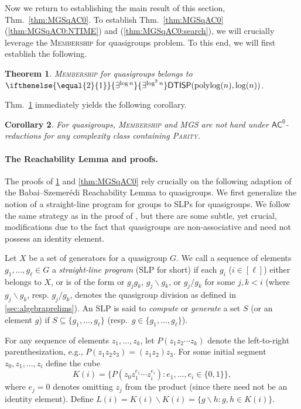 \documentclass{article}
\newtheorem{theorem}{Theorem}\newtheorem{lemma}[theorem]{Lemma}\newtheorem{proposition}[theorem]{Proposition}\newtheorem{corollary}[theorem]{Corollary}\newtheorem{definition}[theorem]{Definition}\newtheorem{claim}[theorem]{Claim}\newtheorem{remark}[theorem]{Remark}\newtheorem{observation}[theorem]{Observation}\newtheorem{conjecture}[theorem]{Conjecture}\newtheorem{example}[theorem]{Example}
\newcommand{\algprobm}[1]{\textsc{#1}\xspace}
\newcommand{\betacc}[1]{\ifthenelse{\equal{#1}{1}}{\exists^{\log n}}{\exists^{\log^{#1}n}}} %
\newcommand{\Thm}[1]{Thm.~\ref{#1}\xspace}
\newcommand*{\ComplexityClass}[1]{\ensuremath{\mathsf{#1}}\xspace}
\newcommand{\DTISP}{\ComplexityClass{DTISP}}
\newcommand{\DTISPpll}{\ensuremath{\DTISP(\mathrm{polylog}(n),\mathrm{log}(n))}\xspace}
\newcommand{\ACz}{\ComplexityClass{AC^0}}
\begin{document}
Now we return to establishing the main result of this section, \Thm{thm:MGSqAC0}. To establish \Thm{thm:MGSqAC0}(\ref{thm:MGSqAC0:NTIME}) and (\ref{thm:MGSqAC0:search}), we will crucially leverage the \algprobm{Membership} for quasigroups problem. To this end, we will first establish the following.
\begin{theorem}\label{thm:CQMqAC0}
\algprobm{Membership} for quasigroups belongs to $\betacc{2}\DTISPpll$.
\end{theorem}

\Thm{thm:CQMqAC0} immediately yields the following corollary. 

\begin{corollary}
For quasigroups, \algprobm{Membership} and \algprobm{MGS} are not hard under $\ACz$-reductions for any complexity class containing \algprobm{Parity}.
\end{corollary}


\paragraph{The Reachability Lemma and proofs.} 
The proofs of \cref{thm:CQMqAC0} and \cref{thm:MGSqAC0} rely crucially on the following adaption of the Babai--Szemer\'edi  Reachability Lemma \cite[Theorem~3.1]{BabaiSzemeredi} to quasigroups. We first generalize the notion of a straight-line program for groups \cite{BabaiSzemeredi} to SLPs for quasigroups. We follow the same strategy as in the proof of \cite[Theorem~3.1]{BabaiSzemeredi}, but there are some subtle, yet crucial, modifications due to the fact that quasigroups are non-associative and need not possess an identity element.

Let $X$ be a set of generators for a quasigroup $G$. We call a sequence of elements $g_{1}, \ldots, g_{\ell} \in G$ a \textit{straight-line program} (SLP for short) if each $g_{i}$ ($i \in [\ell]$) either belongs to $X$, or is of the form or $g_{j}g_{k}$, $g_{j}\backslash g_{k}$, or $g_{j}/ g_{k}$ for some $j, k < i$ (where $g_{j}\backslash g_{k}$, resp. $g_{j}/ g_{k}$, denotes the quasigroup division as defined in \cref{sec:algebraprelims}). An SLP is said to \emph{compute} or \emph{generate} a set $S$ (or an element $g$) if $S \subseteq \{g_1, \dots, g_\ell\}$ (resp.\ $g\in\{g_1, \dots, g_\ell\}$).

For any sequence of elements $z_1,\dotsc,z_k$, let $P(z_1 z_2 \dotsb z_k)$ denote the left-to-right parenthesization, e.g., $P(z_1 z_2 z_3) = (z_1 z_2) z_3$. For some initial segment $z_0, z_{1}, \ldots, z_{i}$ define the cube
\[
K(i) = \{ P(z_0z_{1}^{e_{1}} \cdots z_{i}^{e_{i}}) : e_{1}, \ldots, e_{i} \in \{0,1\}\},
\]
where $e_j=0$ denotes omitting $z_j$ from the product (since there need not be an identity element).
 Define $L(i) = K(i)\backslash K(i) = \{ g\backslash h : g,h \in K(i)\}$.
%
\end{document}
